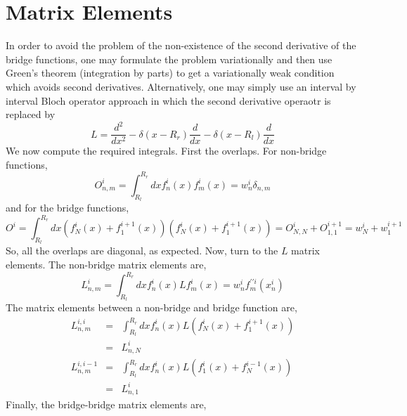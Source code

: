 \section{Matrix Elements}
In order to avoid the problem of the non-existence of the second derivative of the
bridge functions, one may formulate the problem variationally and then use Green's
theorem (integration by parts) to get a variationally weak condition which avoids
second derivatives.  Alternatively, one may simply use an interval by interval
Bloch operator approach in which the second derivative operaotr is replaced by
\begin{equation}
 L = \frac{d^2}{dx^{2}} - \delta(x-R_{r}) \frac{d}{dx} - \delta(x-R_{l}) \frac{d}{dx}
\end{equation}
We now compute the required integrals.  First the overlaps.  For non-bridge functions,
\begin{equation}
    O^{i}_{n,m} = \int_{R_{l}}^{R_{r}} dx f^{i}_{n}(x) f^{i}_{m}(x)
                = w^{i}_{n} \delta_{n,m}
\end{equation}
and for the bridge functions, 
\begin{equation}
        O^{i} = \int_{R_{l}}^{R_{r}} dx ( f^{i}_{N}(x) + f^{i+1}_{1}(x) )
                                        ( f^{i}_{N}(x) + f^{i+1}_{1}(x) )
              = O^{i}_{N,N} + O^{i+1}_{1,1}
              = w^{i}_{N} + w^{i+1}_{1}
\end{equation}
So, all the overlaps are diagonal, as expected.
Now, turn to the $L$ matrix elements. The non-bridge matrix elements are,
\begin{equation}
    L^{i}_{n,m} = \int_{R_{l}}^{R_{r}} dx f^{i}_{n}(x)L f^{i}_{m}(x)
                = w^{i}_{n} f^{ \prime \prime i }_{m}(x^{i}_{n})
\end{equation}
The matrix elements between a non-bridge and bridge function are,
\begin{eqnarray}
    L^{i,i}_{n,m} &=& \int_{R_{l}}^{R_{r}} dx f^{i}_{n}(x) L 
                      ( f^{i}_{N}(x) + f^{i+1}_{1}(x) ) \\ \nonumber
                &=& L^{i}_{n,N} \\ \nonumber
    L^{i,i-1}_{n,m} &=& \int_{R_{l}}^{R_{r}} dx f^{i}_{n}(x) L 
                      ( f^{i}_{1}(x) + f^{i-1}_{N}(x) ) \\ \nonumber
                &=& L^{i}_{n,1} 
\end{eqnarray}
Finally, the bridge-bridge matrix elements are,
